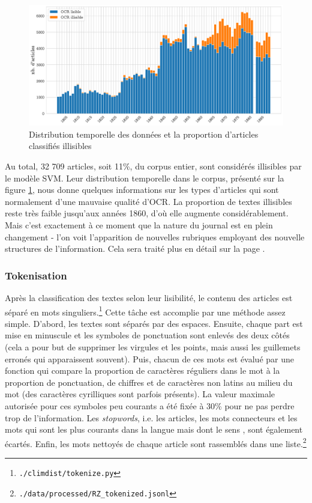 \documentclass[a4paper,twoside,12pt]{article}
\begin{document}
\begin{figure}[h!]
\centering
\captionsetup{justification=centering}
\includegraphics[width=\textwidth]{images/readability_histogram.pdf}
\caption{Distribution temporelle des données et la proportion d'articles classifiés illisibles}
\label{fig:readability_hist}
\end{figure}

Au total, 32 709 articles, soit 11\%, du corpus entier, sont considérés illisibles par le modèle SVM. Leur distribution temporelle dans le corpus, présenté sur la figure \ref{fig:readability_hist}, nous donne quelques informations sur les types d'articles qui sont normalement d'une mauvaise qualité d'OCR. La proportion de textes illisibles reste très faible jusqu'aux années 1860, d'où elle augmente considérablement. Mais c'est exactement à ce moment que la nature du journal est en plein changement - l'on voit l'apparition de nouvelles rubriques employant des nouvelle structures de l'information. Cela sera traité plus en détail sur la page \pageref{beobachtungen_riga}.

\subsubsection{Tokenisation} \label{tokenisation}

Après la classification des textes selon leur lisibilité, le contenu des articles est séparé en mots singuliers.\footnote{\texttt{./climdist/tokenize.py}} Cette tâche est accomplie par une méthode assez simple. D'abord, les textes sont séparés par des espaces. Ensuite, chaque part est mise en minuscule et les symboles de ponctuation sont enlevés des deux côtés (cela a pour but de supprimer les virgules et les points, mais aussi les guillemets erronés qui apparaissent souvent). Puis, chacun de ces \og mots \fg{} est évalué par une fonction qui compare la proportion de caractères réguliers dans le mot à la proportion de ponctuation, de chiffres et de caractères non latins au milieu du mot (des caractères cyrilliques sont parfois présents). La valeur maximale autorisée pour ces symboles peu courants a été fixée à 30\% pour ne pas perdre trop de l'information. Les \textit{stopwords}, i.e. les articles, les mots \og connecteurs \fg{} et les mots qui sont les plus courants dans la langue mais dont le sens , sont également écartés. Enfin, les mots nettoyés de chaque article sont rassemblés dans une liste.\footnote{\texttt{./data/processed/RZ\_tokenized.jsonl}}
\end{document}
